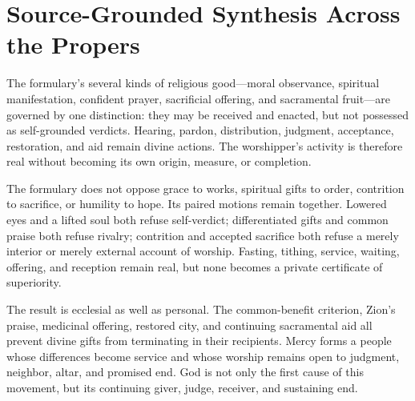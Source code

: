 \sectionguard
\section*{Source-Grounded Synthesis Across the Propers}

The formulary's several kinds of religious good---moral observance, spiritual
manifestation, confident prayer, sacrificial offering, and sacramental
fruit---are governed by one distinction: they may be received and enacted,
but not possessed as self-grounded verdicts. Hearing, pardon, distribution,
judgment, acceptance, restoration, and aid remain divine actions. The
worshipper's activity is therefore real without becoming its own origin,
measure, or completion.

The formulary does not oppose grace to works, spiritual gifts to order,
contrition to sacrifice, or humility to hope. Its paired motions remain
together. Lowered eyes and a lifted soul both refuse
self-verdict; differentiated gifts and common praise both refuse rivalry;
contrition and accepted sacrifice both refuse a merely interior or merely
external account of worship. Fasting, tithing, service, waiting, offering, and
reception remain real, but none becomes a private certificate of superiority.

The result is ecclesial as well as personal. The common-benefit criterion,
Zion's praise, medicinal offering, restored city, and continuing sacramental
aid all prevent divine gifts from terminating in their recipients. Mercy
forms a people whose differences become service and whose worship remains
open to judgment, neighbor, altar, and promised end. God is not only the first
cause of this movement, but its continuing giver, judge, receiver, and
sustaining end.
